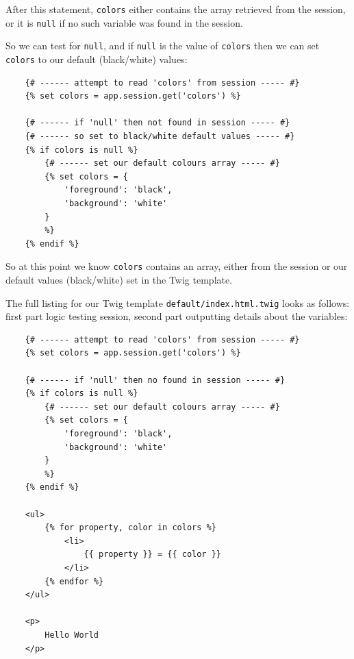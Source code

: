 \documentclass[a4paperpaper,openright]{book}
\newenvironment{Shaded}{}{}
\newcommand{\NormalTok}[1]{#1}
\begin{document}
\begin{Shaded}
\begin{Highlighting}[]
\NormalTok{    \{%
\end{Highlighting}
\end{Shaded}

After this statement, \texttt{colors} either contains the array
retrieved from the session, or it is \texttt{null} if no such variable
was found in the session.

So we can test for \texttt{null}, and if \texttt{null} is the value of
\texttt{colors} then we can set \texttt{colors} to our default
(black/white) values:

\begin{verbatim}
    {# ------ attempt to read 'colors' from session ----- #}
    {% set colors = app.session.get('colors') %}

    {# ------ if 'null' then not found in session ----- #}
    {# ------ so set to black/white default values ----- #}
    {% if colors is null %}
        {# ------ set our default colours array ----- #}
        {% set colors = {
            'foreground': 'black',
            'background': 'white'
        }
        %}
    {% endif %}
\end{verbatim}

So at this point we know \texttt{colors} contains an array, either from
the session or our default values (black/white) set in the Twig
template.

The full listing for our Twig template \texttt{default/index.html.twig}
looks as follows: first part logic testing session, second part
outputting details about the variables:

\begin{verbatim}
    {# ------ attempt to read 'colors' from session ----- #}
    {% set colors = app.session.get('colors') %}

    {# ------ if 'null' then no found in session ----- #}
    {% if colors is null %}
        {# ------ set our default colours array ----- #}
        {% set colors = {
            'foreground': 'black',
            'background': 'white'
        }
        %}
    {% endif %}

    <ul>
        {% for property, color in colors %}
            <li>
                {{ property }} = {{ color }}
            </li>
        {% endfor %}
    </ul>

    <p>
        Hello World
    </p>
\end{verbatim}
\end{document}
